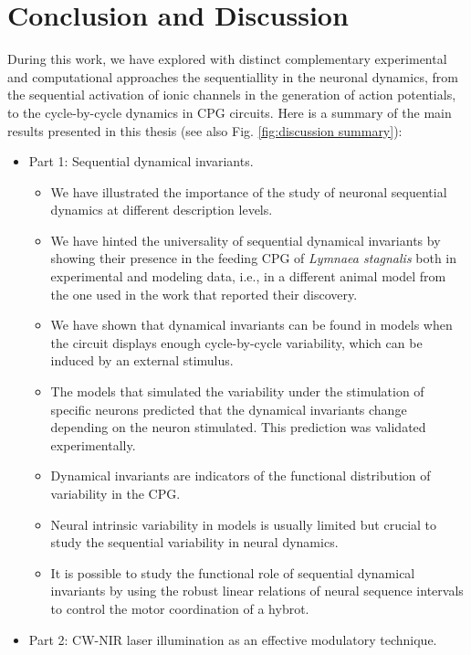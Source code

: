 \chapter{Conclusion and Discussion} %
\label{c-conclusion}

During this work, we have explored with distinct  complementary experimental and computational  approaches the sequentiallity in the neuronal dynamics, from the sequential activation of ionic channels in the generation of action potentials, to the cycle-by-cycle dynamics in CPG circuits. Here is a summary of the main results presented in this thesis (see also Fig. \ref{fig:discussion summary}):

\begin{itemize}
	\item Part 1: Sequential dynamical invariants.
 \begin{itemize}
     \item We have illustrated the importance of the study of neuronal sequential dynamics at different description levels.
     \item We have hinted the universality of sequential dynamical invariants by showing their  presence in the feeding CPG of  \textit{Lymnaea stagnalis} both in experimental and modeling data, i.e., in a different animal model from the one used in the work that reported their discovery.
     \item We have shown that dynamical invariants can be found in models when the circuit displays enough cycle-by-cycle variability, which can be induced by an external stimulus.
     \item The models that simulated the variability under the stimulation of specific neurons predicted that the dynamical invariants change depending on the neuron stimulated. This prediction was validated experimentally.
     \item Dynamical invariants are indicators of the functional distribution of  variability  in the CPG.
     \item Neural intrinsic variability in models is usually limited but crucial to study the sequential variability in neural dynamics.
     \item It is possible to study the functional role of sequential dynamical invariants by using  the robust linear relations of neural sequence intervals to control the motor coordination of a hybrot.
 \end{itemize}
	\item Part 2: CW-NIR laser illumination as an effective modulatory technique.

\end{itemize}
